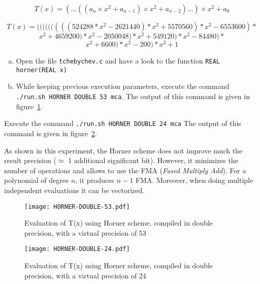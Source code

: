 \[
	T(x) = (\dots((a_n\times x^2 + a_{n-1})\times x^2 + a_{n-2})\dots) \times x^2
    + a_0
\]

$$T(x) = (((((((((524288*x^2-2621440)*x^2+5570560)*x^2-6553600)*$$
$$x^2+4659200)*x^2-2050048)*x^2+549120)*x^2-84480)*$$
$$x^2+6600)*x^2-200)*x^2+1$$

\begin{question}
  \begin{enumerate}[(a)]
  \item Open the file {\tt tchebychev.c} and have a look to the function {\tt REAL horner(REAL x)}
\item While keeping previous execution parameters, execute the command {\tt ./run.sh HORNER DOUBLE 53 mca}.  \newline The output of this command is given in figure~\ref{fig:horner:double:53}.
  \end{enumerate}
\end{question}

\begin{question}
\item Execute the command {\tt ./run.sh HORNER DOUBLE 24 mca}  \newline
The output of this command is given in figure~\ref{fig:horner:double:24}.
\end{question}

As shown in this experiment, the Horner scheme does not improve much the result
precision ($\simeq$ 1 additional significant bit). However, it minimizes the
number of operations and allows to use the FMA ({\it Fused Multiply Add}). For
a polynomial of degree $n$, it produces $n-1$ FMA. Moreover, when doing
multiple independent evaluations it can be vectorized.

\begin{figure}[htb]
\center \texttt{[image: HORNER-DOUBLE-53.pdf]}
  \caption{Evaluation of T(x) using Horner scheme, compiled in double precision, with a virtual precision of 53}
  \label{fig:horner:double:53}
\end{figure}
\begin{figure}[htb]
\center \texttt{[image: HORNER-DOUBLE-24.pdf]}
  \caption{Evaluation of T(x) using Horner scheme, compiled in double precision, with a virtual precision of 24}
  \label{fig:horner:double:24}
\end{figure}

